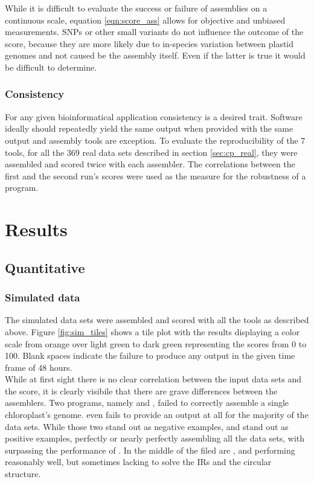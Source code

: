 While it is difficult to evaluate the success or failure of assemblies on a continuous scale, equation
\ref{eqn:score_ass} allows for objective and unbiased measurements. SNPs or other small variants do not
influence the outcome of the score, because they are more likely due to in-species variation between plastid
genomes and not caused be the assembly itself. Even if the latter is true it would be difficult to determine.
  
\subsubsection{Consistency}
For any given bioinformatical application consistency is a desired trait. Software ideally should repeatedly
yield the same output when provided with the same output and assembly tools are exception. To evaluate the
reproducibility of the 7 tools, for all the 369 real data sets described in section \ref{sec:cp_real}, they
were assembled and scored twice with each assembler. The correlations between the first and the second run's
scores were used as the measure for the robustness of a program.

\section{Results} \label{results:ca}
\subsection{Quantitative}
\subsubsection{Simulated data}
\label{results:sim}

The simulated data sets were assembled and scored with all the tools as described above. Figure
\ref{fig:sim_tiles} shows a tile plot with the results displaying a color scale from orange over light
green to dark green representing the scores from 0 to 100. Blank spaces indicate the failure to produce any output in the given time frame of 48 hours. \\
While at first sight there is no clear correlation between the input data sets and the score, it is clearly
visibile that there are grave differences between the assemblers. Two programs, namely \cassp \hspace{0.5ex}
and \ioga, failed to correctly assemble a single chloroplast's genome. \ioga \hspace{0.5ex} even fails to
provide an output at all for the majority of the data sets. While those two stand out as negative examples,
\fp \hspace{0.5ex} and \go \hspace{0.5ex} stand out as positive examples, perfectly or nearly perfectly
assembling all the data sets, with \go \hspace{0.5ex} surpassing the performance of \fp. In the middle of the
filed are \ce, \oa \hspace{0.5ex} and \np \hspace{0.5ex} performing reasonably well, but sometimes lacking to
solve the IRs and the circular structure.

